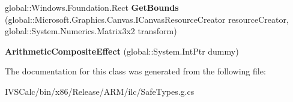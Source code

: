 \begin{DoxyCompactItemize}
global\+::\+Windows.\+Foundation.\+Rect {\bfseries Get\+Bounds} (global\+::\+Microsoft.\+Graphics.\+Canvas.\+I\+Canvas\+Resource\+Creator resource\+Creator, global\+::\+System.\+Numerics.\+Matrix3x2 transform)
\item 
\mbox{\label{class_microsoft_1_1_graphics_1_1_canvas_1_1_effects_1_1_arithmetic_composite_effect_a0b741230609e3e96b63205529cafcc0e}} 
{\bfseries Arithmetic\+Composite\+Effect} (global\+::\+System.\+Int\+Ptr dummy)
\end{DoxyCompactItemize}


The documentation for this class was generated from the following file\+:\begin{DoxyCompactItemize}
\item 
I\+V\+S\+Calc/bin/x86/\+Release/\+A\+R\+M/ilc/Safe\+Types.\+g.\+cs\end{DoxyCompactItemize}

